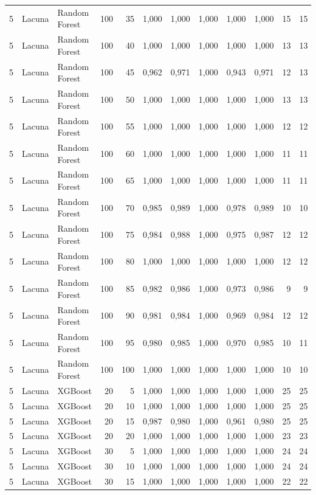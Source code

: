 \begin{longtable}{@{}rllrrrrrrrrr@{}}
5 & Lacuna & Random Forest & 100 & 35 & 1,000 & 1,000 & 1,000 & 1,000 & 1,000 & 15 & 15 \\
5 & Lacuna & Random Forest & 100 & 40 & 1,000 & 1,000 & 1,000 & 1,000 & 1,000 & 13 & 13 \\
5 & Lacuna & Random Forest & 100 & 45 & 0,962 & 0,971 & 1,000 & 0,943 & 0,971 & 12 & 13 \\
5 & Lacuna & Random Forest & 100 & 50 & 1,000 & 1,000 & 1,000 & 1,000 & 1,000 & 13 & 13 \\
5 & Lacuna & Random Forest & 100 & 55 & 1,000 & 1,000 & 1,000 & 1,000 & 1,000 & 12 & 12 \\
5 & Lacuna & Random Forest & 100 & 60 & 1,000 & 1,000 & 1,000 & 1,000 & 1,000 & 11 & 11 \\
5 & Lacuna & Random Forest & 100 & 65 & 1,000 & 1,000 & 1,000 & 1,000 & 1,000 & 11 & 11 \\
5 & Lacuna & Random Forest & 100 & 70 & 0,985 & 0,989 & 1,000 & 0,978 & 0,989 & 10 & 10 \\
5 & Lacuna & Random Forest & 100 & 75 & 0,984 & 0,988 & 1,000 & 0,975 & 0,987 & 12 & 12 \\
5 & Lacuna & Random Forest & 100 & 80 & 1,000 & 1,000 & 1,000 & 1,000 & 1,000 & 12 & 12 \\
5 & Lacuna & Random Forest & 100 & 85 & 0,982 & 0,986 & 1,000 & 0,973 & 0,986 & 9 & 9 \\
5 & Lacuna & Random Forest & 100 & 90 & 0,981 & 0,984 & 1,000 & 0,969 & 0,984 & 12 & 12 \\
5 & Lacuna & Random Forest & 100 & 95 & 0,980 & 0,985 & 1,000 & 0,970 & 0,985 & 10 & 11 \\
5 & Lacuna & Random Forest & 100 & 100 & 1,000 & 1,000 & 1,000 & 1,000 & 1,000 & 10 & 10 \\
5 & Lacuna & XGBoost & 20 & 5 & 1,000 & 1,000 & 1,000 & 1,000 & 1,000 & 25 & 25 \\
5 & Lacuna & XGBoost & 20 & 10 & 1,000 & 1,000 & 1,000 & 1,000 & 1,000 & 25 & 25 \\
5 & Lacuna & XGBoost & 20 & 15 & 0,987 & 0,980 & 1,000 & 0,961 & 0,980 & 25 & 25 \\
5 & Lacuna & XGBoost & 20 & 20 & 1,000 & 1,000 & 1,000 & 1,000 & 1,000 & 23 & 23 \\
5 & Lacuna & XGBoost & 30 & 5 & 1,000 & 1,000 & 1,000 & 1,000 & 1,000 & 24 & 24 \\
5 & Lacuna & XGBoost & 30 & 10 & 1,000 & 1,000 & 1,000 & 1,000 & 1,000 & 24 & 24 \\
5 & Lacuna & XGBoost & 30 & 15 & 1,000 & 1,000 & 1,000 & 1,000 & 1,000 & 22 & 22 \\

\end{longtable}
